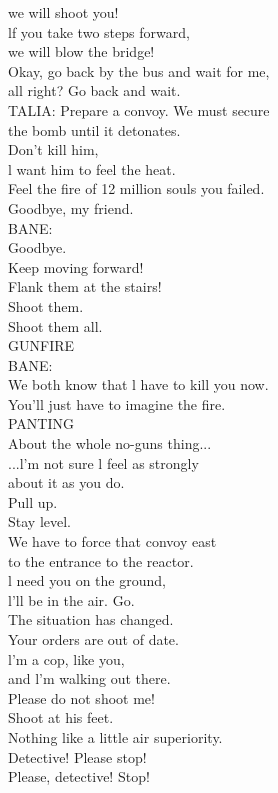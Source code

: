 \documentclass{article}
\begin{document}
\begin{multicols}{3}
we will shoot you!\\
lf you take two steps forward,\\
we will blow the bridge!\\
Okay, go back by the bus and wait for me,\\
all right? Go back and wait.\\
TALIA: Prepare a convoy. We must secure\\
the bomb until it detonates.\\
Don't kill him,\\
l want him to feel the heat.\\
Feel the fire of 12 million souls you failed.\\
Goodbye, my friend.\\
BANE:\\
Goodbye.\\
Keep moving forward!\\
Flank them at the stairs!\\
Shoot them.\\
Shoot them all.\\
GUNFIRE\\
BANE:\\
We both know that l have to kill you now.\\
You'll just have to imagine the fire.\\
PANTING\\
About the whole no-guns thing...\\
...l'm not sure l feel as strongly\\
about it as you do.\\
Pull up.\\
Stay level.\\
We have to force that convoy east\\
to the entrance to the reactor.\\
l need you on the ground,\\
l'll be in the air. Go.\\
The situation has changed.\\
Your orders are out of date.\\
l'm a cop, like you,\\
and l'm walking out there.\\
Please do not shoot me!\\
Shoot at his feet.\\
Nothing like a little air superiority.\\
Detective! Please stop!\\
Please, detective! Stop!\\

\end{multicols}
\end{document}
